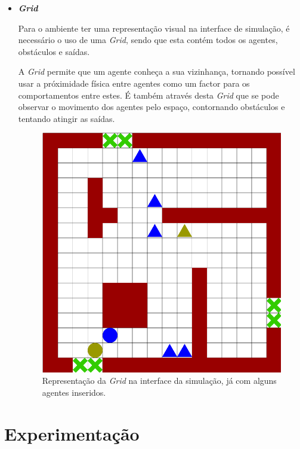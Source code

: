 \documentclass[12pt]{article}
\begin{document}
\begin{titlepage}
\begin{itemize}
\begin{itemize}
\item \textbf{\textit{Grid}}

Para o ambiente ter uma representação visual na interface de simulação, é necessário o uso de uma \textit{Grid}, sendo que esta contém todos os agentes, obstáculos e saídas.

A \textit{Grid} permite que um agente conheça a sua vizinhança, tornando possível usar a próximidade física entre agentes como um factor para os comportamentos entre estes. É também através desta \textit{Grid} que se pode observar o movimento dos agentes pelo espaço, contornando obstáculos e tentando atingir as saídas.

\begin{figure}[H]
	\centering
	\includegraphics[scale=0.20]{map_simulation.png}
	\caption{Representação da \textit{Grid} na interface da simulação, já com alguns agentes inseridos.}
	\label{map}
\end{figure}

\end{itemize}
\end{itemize}

\newpage
\section{Experimentação}


\end{titlepage}
\end{document}
